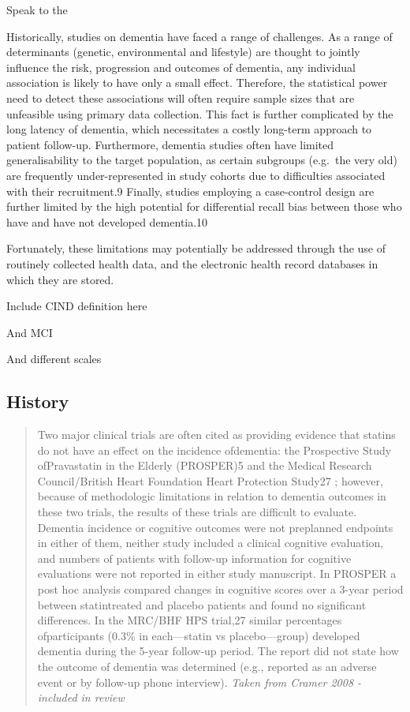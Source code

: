 \documentclass[a4paper, nobind]{templates/ociamthesis}
\begin{document}
Speak to the

Historically, studies on dementia have faced a range of challenges. As a range of determinants (genetic, environmental and lifestyle) are thought to jointly influence the risk, progression and outcomes of dementia, any individual association is likely to have only a small effect. Therefore, the statistical power need to detect these associations will often require sample sizes that are unfeasible using primary data collection.
This fact is further complicated by the long latency of dementia, which necessitates a costly long-term approach to patient follow-up. Furthermore, dementia studies often have limited generalisability to the target population, as certain subgroups (e.g.~the very old) are frequently under-represented in study cohorts due to difficulties associated with their recruitment.9 Finally, studies employing a case-control design are further limited by the high potential for differential recall bias between those who have and have not developed dementia.10

Fortunately, these limitations may potentially be addressed through the use of routinely collected health data, and the electronic health record databases in which they are stored.

Include CIND definition here

And MCI

And different scales

\hypertarget{history}{%
\subsection{History}\label{history}}

\begin{quote}
Two major clinical trials are often cited as providing
evidence that statins do not have an effect on the incidence ofdementia: the Prospective Study ofPravastatin in the Elderly (PROSPER)5
and the Medical Research
Council/British Heart Foundation Heart Protection Study27
; however, because of methodologic limitations in relation to dementia outcomes in these two trials, the results of these trials are difficult to evaluate. Dementia incidence or cognitive outcomes were not preplanned endpoints in either of them, neither study included a clinical cognitive evaluation, and numbers of patients with follow-up information for cognitive evaluations were not reported in either study manuscript. In PROSPER a post hoc analysis compared changes in cognitive scores over a 3-year period between statintreated and placebo patients and found no significant differences. In the MRC/BHF HPS trial,27
similar percentages ofparticipants (0.3\% in each---statin vs placebo---group) developed dementia during the 5-year follow-up period. The report did not state how the outcome of dementia was determined (e.g., reported as an adverse event or by follow-up phone interview).
\emph{Taken from Cramer 2008 - included in review}
\end{quote}
\end{document}
